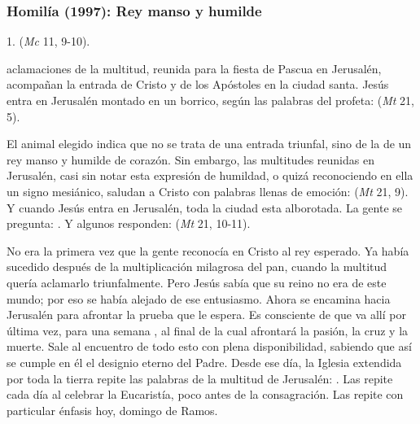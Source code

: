\label{b2-04-01-1994H}
\newpage

\subsubsection{Homilía (1997): Rey manso y humilde}


\begin{body}
1.  (\textit{Mc} 11, 9-10). 

 aclamaciones de la multitud, reunida para la fiesta de Pascua en Jerusalén, acompañan la entrada de Cristo y de los Apóstoles en la ciudad santa. Jesús entra en Jerusalén montado en un borrico, según las palabras del profeta:  (\textit{Mt} 21, 5).

El animal elegido indica que no se trata de una entrada triunfal, sino de la de un rey manso y humilde de corazón. Sin embargo, las multitudes reunidas en Jerusalén, casi sin notar esta expresión de humildad, o quizá reconociendo en ella un signo mesiánico, saludan a Cristo con palabras llenas de emoción:  (\textit{Mt} 21, 9). Y cuando Jesús entra en Jerusalén, toda la ciudad esta alborotada. La gente se pregunta: . Y algunos responden:  (\textit{Mt} 21, 10-11).

No era la primera vez que la gente reconocía en Cristo al rey esperado. Ya había sucedido después de la multiplicación milagrosa del pan, cuando la multitud quería aclamarlo triunfalmente. Pero Jesús sabía que su reino no era de este mundo; por eso se había alejado de ese entusiasmo. Ahora se encamina hacia Jerusalén para afrontar la prueba que le espera. Es consciente de que va allí por última vez, para una semana , al final de la cual afrontará la pasión, la cruz y la muerte. Sale al encuentro de todo esto con plena disponibilidad, sabiendo que así se cumple en él el designio eterno del Padre. Desde ese día, la Iglesia extendida por toda la tierra repite las palabras de la multitud de Jerusalén: . Las repite cada día al celebrar la Eucaristía, poco antes de la consagración. Las repite con particular énfasis hoy, domingo de Ramos.


\end{body}
